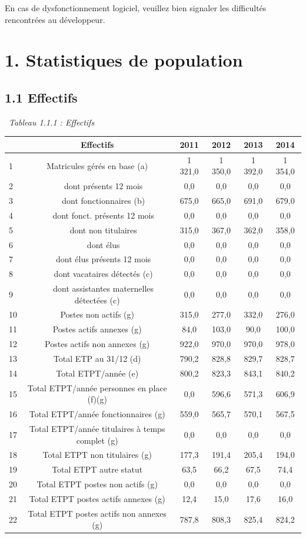 En cas de dysfonctionnement logiciel, veuillez bien signaler les
difficultés rencontrées au développeur.

\hypertarget{statistiques-de-population}{%
\section{1. Statistiques de
population}\label{statistiques-de-population}}

\hypertarget{effectifs}{%
\subsection{1.1 Effectifs}\label{effectifs}}

~\emph{Tableau 1.1.1 : Effectifs}

\begin{longtable}[]{@{}lccccc@{}}
\toprule
& Effectifs & 2011 & 2012 & 2013 & 2014\tabularnewline
\midrule
\endhead
1 & Matricules gérés en base (a) & 1 321,0 & 1 350,0 & 1 392,0 & 1
354,0\tabularnewline
2 & ~~~dont présents 12 mois & 0,0 & 0,0 & 0,0 & 0,0\tabularnewline
3 & ~~~dont fonctionnaires (b) & 675,0 & 665,0 & 691,0 &
679,0\tabularnewline
4 & ~~~dont fonct. présents 12 mois & 0,0 & 0,0 & 0,0 &
0,0\tabularnewline
5 & ~~~dont non titulaires & 315,0 & 367,0 & 362,0 &
358,0\tabularnewline
6 & ~~~dont élus & 0,0 & 0,0 & 0,0 & 0,0\tabularnewline
7 & ~~~dont élus présents 12 mois & 0,0 & 0,0 & 0,0 & 0,0\tabularnewline
8 & ~~~dont vacataires détectés (c) & 0,0 & 0,0 & 0,0 &
0,0\tabularnewline
9 & ~~~dont assistantes maternelles détectées (c) & 0,0 & 0,0 & 0,0 &
0,0\tabularnewline
10 & Postes non actifs (g) & 315,0 & 277,0 & 332,0 &
276,0\tabularnewline
11 & Postes actifs annexes (g) & 84,0 & 103,0 & 90,0 &
100,0\tabularnewline
12 & Postes actifs non annexes (g) & 922,0 & 970,0 & 970,0 &
978,0\tabularnewline
13 & Total ETP au 31/12 (d) & 790,2 & 828,8 & 829,7 &
828,7\tabularnewline
14 & Total ETPT/année (e) & 800,2 & 823,3 & 843,1 & 840,2\tabularnewline
15 & Total ETPT/année personnes en place (f)(g) & 0,0 & 596,6 & 571,3 &
606,9\tabularnewline
16 & Total ETPT/année fonctionnaires (g) & 559,0 & 565,7 & 570,1 &
567,5\tabularnewline
17 & Total ETPT/année titulaires à temps complet (g) & 0,0 & 0,0 & 0,0 &
0,0\tabularnewline
18 & Total ETPT non titulaires (g) & 177,3 & 191,4 & 205,4 &
194,0\tabularnewline
19 & Total ETPT autre statut & 63,5 & 66,2 & 67,5 & 74,4\tabularnewline
20 & Total ETPT postes non actifs (g) & 0,0 & 0,0 & 0,0 &
0,0\tabularnewline
21 & Total ETPT postes actifs annexes (g) & 12,4 & 15,0 & 17,6 &
16,0\tabularnewline
22 & Total ETPT postes actifs non annexes (g) & 787,8 & 808,3 & 825,4 &
824,2\tabularnewline
\bottomrule
\end{longtable}

